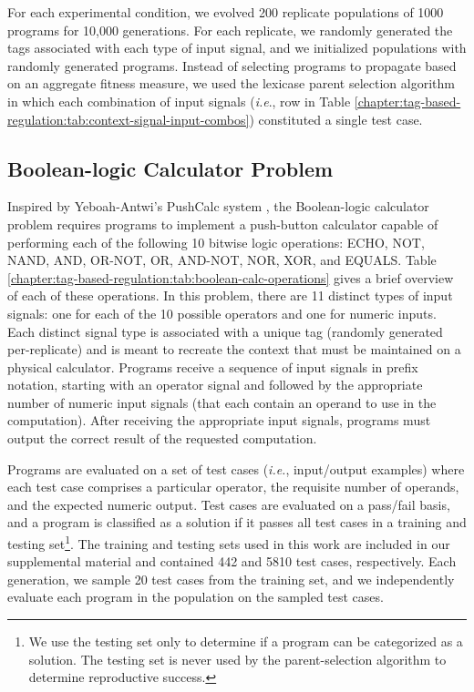 For each experimental condition, we evolved 200 replicate populations of 1000 programs for 10,000 generations.
For each replicate, we randomly generated the tags associated with each type of input signal, and we initialized populations with randomly generated programs.
Instead of selecting programs to propagate based on an aggregate fitness measure, we used the lexicase parent selection algorithm \citep{helmuth_solving_2015} in which each combination of input signals (\textit{i.e}., row in Table \ref{chapter:tag-based-regulation:tab:context-signal-input-combos}) constituted a single test case. 

\subsection{Boolean-logic Calculator Problem}
\label{chapter:tag-based-regulation:sec:methods:boolean-calc-problem}

Inspired by Yeboah-Antwi's PushCalc system \citep{yeboah-antwi_evolving_2012}, 
the Boolean-logic calculator problem requires programs to implement a push-button calculator capable of performing each of the following 10 bitwise logic operations: ECHO, NOT, NAND, AND, OR-NOT, OR, AND-NOT, NOR, XOR, and EQUALS. 
Table \ref{chapter:tag-based-regulation:tab:boolean-calc-operations} gives a brief overview of each of these operations. 
In this problem, there are 11 distinct types of input signals: one for each of the 10 possible operators and one for numeric inputs. 
Each distinct signal type is associated with a unique tag (randomly generated per-replicate) and is meant to recreate the context that must be maintained on a physical calculator.
Programs receive a sequence of input signals in prefix notation, starting with an operator signal and followed by the appropriate number of numeric input signals (that each contain an operand to use in the computation).
After receiving the appropriate input signals, programs must output the correct result of the requested computation.



Programs are evaluated on a set of test cases (\textit{i.e.}, input/output examples) where each test case comprises a particular operator, the requisite number of operands, and the expected numeric output.
Test cases are evaluated on a pass/fail basis, and a program is classified as a solution if it passes all test cases in a training and testing set\footnote{
We use the testing set only to determine if a program can be categorized as a solution. The testing set is never used by the parent-selection algorithm to determine reproductive success.
}.
The training and testing sets used in this work are included in our supplemental material \citep{tag_regulation_supplement_2021} and contained 442 and 5810 test cases, respectively.
Each generation, we sample 20 test cases from the training set, and we independently evaluate each program in the population on the sampled test cases.


